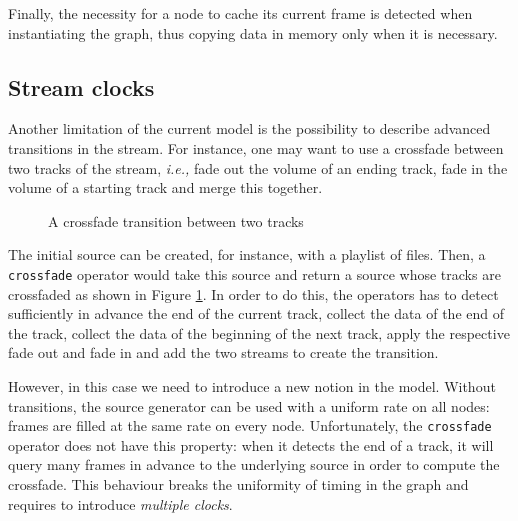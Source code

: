 \documentclass{llncs}
\newcommand{\ie}{{\em i.e.,}}
\begin{document}
Finally, the necessity for a node to cache its current frame is detected when instantiating the graph, thus
copying data in memory only when it is necessary.

\subsection*{Stream clocks}


Another limitation of the current model is the possibility to describe advanced transitions in 
the stream. For instance, one may want to use a crossfade between two tracks 
of the stream, \ie{}
fade out the volume of an ending track, fade in the volume of a starting track and merge this together.

\begin{figure}[htn]
 \begin{center}
\end{center}
 \caption{A crossfade transition between two tracks}
 \label{cross-fig}
\end{figure}

The initial source can be created, for instance, with a playlist of files. Then,
a \texttt{crossfade} operator would take this source and return a source whose tracks are 
crossfaded as shown in Figure \ref{cross-fig}. In order to do this, the operators has to 
detect sufficiently in advance the end of the current track, collect the data of the
end of the track, collect the data of the beginning of the next track, apply the respective
fade out and fade in and add the two streams to create the transition.

However, in this case we need to introduce a new notion in the model. Without transitions, the 
source generator can be used with a uniform rate on all nodes: frames are filled
at the same rate on every node. Unfortunately, the \texttt{crossfade} operator
does not have this property: when it detects the end of a track, it will query many frames in advance 
to the underlying source in order to compute the crossfade. This behaviour breaks the uniformity of 
timing in the graph and requires to introduce \textit{multiple clocks}.
\end{document}
